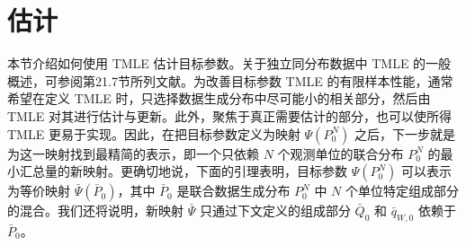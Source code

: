 \section{估计}

本节介绍如何使用 TMLE 估计目标参数。关于独立同分布数据中 TMLE 的一般概述，可参阅第21.7节所列文献。为改善目标参数 TMLE 的有限样本性能，通常希望在定义 TMLE 时，只选择数据生成分布中尽可能小的相关部分，然后由 TMLE 对其进行估计与更新。此外，聚焦于真正需要估计的部分，也可以使所得 TMLE 更易于实现。因此，在把目标参数定义为映射 $\Psi(P_0^N)$ 之后，下一步就是为这一映射找到最精简的表示，即一个只依赖 $N$ 个观测单位的联合分布 $P_0^N$ 的最小汇总量的新映射。更确切地说，下面的引理表明，目标参数 $\Psi(P_0^N)$ 可以表示为等价映射 $\bar\Psi(\bar P_0)$，其中 $\bar P_0$ 是联合数据生成分布 $P_0^N$ 中 $N$ 个单位特定组成部分的混合。我们还将说明，新映射 $\bar\Psi$ 只通过下文定义的组成部分 $\bar Q_0$ 和 $\bar q_{W,0}$ 依赖于 $\bar P_0$。

